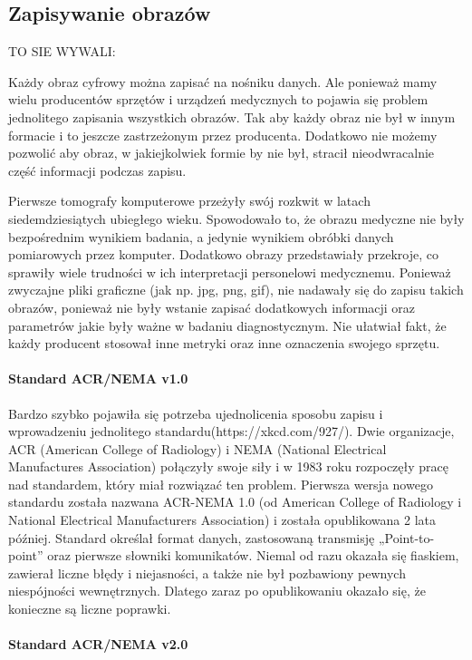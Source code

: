 \subsection{Zapisywanie obrazów}

TO SIE WYWALI:

Każdy obraz cyfrowy można zapisać na nośniku danych.
Ale ponieważ mamy wielu producentów sprzętów i urządzeń medycznych to pojawia się problem jednolitego zapisania wszystkich obrazów.
Tak aby każdy obraz nie był w innym formacie i to jeszcze zastrzeżonym przez producenta.
Dodatkowo nie możemy pozwolić aby obraz, w jakiejkolwiek formie by nie był, stracił nieodwracalnie część informacji podczas zapisu.

Pierwsze tomografy komputerowe przeżyły swój rozkwit w latach siedemdziesiątych ubiegłego wieku.
Spowodowało to, że obrazu medyczne nie były bezpośrednim wynikiem badania, a jedynie wynikiem obróbki danych pomiarowych przez komputer.
Dodatkowo obrazy przedstawiały przekroje, co sprawiły wiele trudności w ich interpretacji personelowi medycznemu.
Ponieważ zwyczajne pliki graficzne (jak np. jpg, png, gif), nie nadawały się do zapisu takich obrazów, ponieważ nie były wstanie zapisać dodatkowych informacji oraz parametrów jakie były ważne w badaniu diagnostycznym.
Nie ułatwiał fakt, że każdy producent stosował inne metryki oraz inne oznaczenia swojego sprzętu.

\paragraph{Standard ACR/NEMA v1.0}

Bardzo szybko pojawiła się potrzeba ujednolicenia sposobu zapisu i wprowadzeniu jednolitego standardu(https://xkcd.com/927/).
Dwie organizacje, ACR (American College of Radiology) i NEMA (National Electrical Manufactures Association) połączyły swoje siły i w 1983 roku rozpoczęły pracę nad standardem, który miał rozwiązać ten problem.
Pierwsza wersja nowego standardu została nazwana ACR-NEMA 1.0 (od American College of Radiology i National Electrical Manufacturers Association) i została opublikowana 2 lata później.
Standard określał format danych, zastosowaną transmisję „Point-to-point” oraz pierwsze słowniki komunikatów.
Niemal od razu okazała się fiaskiem, zawierał liczne błędy i niejasności, a także nie był pozbawiony pewnych niespójności wewnętrznych.
Dlatego zaraz po opublikowaniu okazało się, że konieczne są liczne poprawki. 

\paragraph{Standard ACR/NEMA v2.0}

